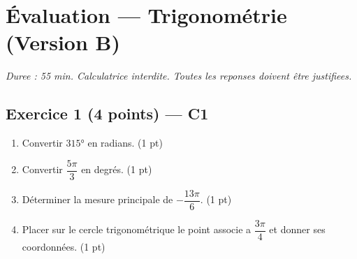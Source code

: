 

\section*{Évaluation — Trigonométrie (Version B)}
\textit{Duree : 55 min. Calculatrice interdite. Toutes les reponses doivent être justifiees.}

\bigskip

\subsection*{Exercice 1 \hfill (4 points) — C1}

\begin{enumerate}
  \item Convertir $315°$ en radians. \hfill (1 pt)
  \item Convertir $\dfrac{5\pi}{3}$ en degrés. \hfill (1 pt)
  \item Déterminer la mesure principale de $-\dfrac{13\pi}{6}$. \hfill (1 pt)
  \item Placer sur le cercle trigonométrique le point associe a $\dfrac{3\pi}{4}$ et donner ses coordonnées. \hfill (1 pt)
\end{enumerate}

